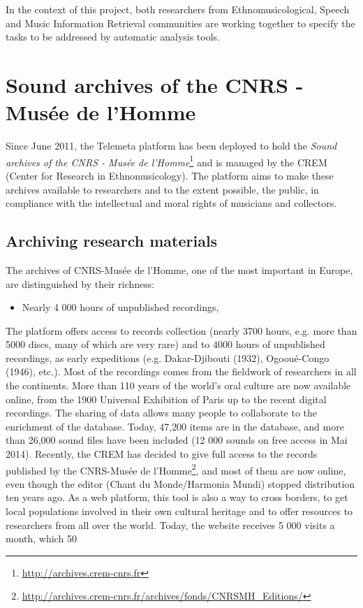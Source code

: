 \documentclass{sig-alternate}
\begin{document}
In the context of this project, both researchers from Ethnomusicological, Speech and Music Information Retrieval communities are working together to specify the tasks to be addressed by automatic analysis tools.



\section{Sound archives of the CNRS - Musée de l'Homme}\label{sec:archives-CREM}
Since June 2011, the Telemeta platform has been deployed to hold the \emph{Sound archives of the CNRS - Musée de l'Homme}\footnote{\url{http://archives.crem-cnrs.fr}} and is managed by the CREM (Center for Research in Ethnomusicology).
The platform aims to make these archives available to researchers and to the extent possible, the public, in compliance with the intellectual and moral rights of musicians and collectors.
\subsection{Archiving research materials}
The archives of CNRS-Musée de l’Homme, one of the most important in Europe, are distinguished by their richness:
\begin{itemize}
\item Nearly 4 000 hours of unpublished recordings,
\end{itemize}
The platform offers access to records collection (nearly 3700 hours, e.g. more than 5000 discs, many of which are very rare) and to 4000 hours of unpublished recordings, as early expeditions (e.g. Dakar-Djibouti (1932), Ogooué-Congo (1946), etc.). Most of the recordings comes from the fieldwork of researchers in all the continents. 
More than 110 years of the world's oral culture are now available online, from the 1900 Universal Exhibition of Paris up to the recent digital recordings. The sharing of data allows many people to collaborate to the enrichment of the database. Today, 47,200 items are in the database, and more than 26,000 sound files have been included (12 000 sounds on free access in Mai 2014). Recently, the CREM has decided to give full access to the records published by the CNRS-Musée de l’Homme\footnote{\url{http://archives.crem-cnrs.fr/archives/fonds/CNRSMH_Editions/}}, and most of them are now online, even though the editor (Chant du Monde/Harmonia Mundi) stopped distribution ten years ago. 
As a web platform, this tool is also a way to cross borders, to get local populations involved in their own cultural heritage and to offer resources to researchers from all over the world. Today, the website receives 5 000 visits a month, which 50%
 
\end{document}

